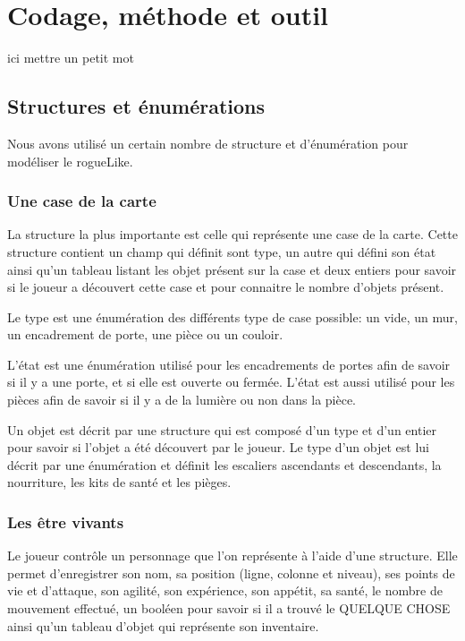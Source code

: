 \documentclass[11pt]{report}
\begin{document}
\chapter{Codage, méthode et outil}

ici mettre un petit mot

	\section{Structures et énumérations}
	
	Nous avons utilisé un certain nombre de structure et d'énumération pour modéliser le rogueLike.
	
		\subsection{Une case de la carte}
	
		La structure la plus importante est celle qui représente une case de la carte. Cette structure contient un champ qui définit sont type, un autre qui défini son état ainsi qu'un tableau listant les objet présent sur la case et deux entiers pour savoir si le joueur a découvert cette case et pour connaitre le nombre d'objets présent.
	
		Le type est une énumération des différents type de case possible: un vide, un mur, un encadrement de porte, une pièce ou un couloir.
	
		L'état est une énumération utilisé pour les encadrements de portes afin de savoir si il y a une porte, et si elle est ouverte ou fermée. L'état est aussi utilisé pour les pièces afin de savoir si il y a de la lumière ou non dans la pièce.
	
		Un objet est décrit par une structure qui est composé d'un type et d'un entier pour savoir si l'objet a été découvert par le joueur. Le type d'un objet est lui décrit par une énumération et définit les escaliers ascendants et descendants, la nourriture, les kits de santé et les pièges.
		
		\subsection{Les être vivants}
		
		Le joueur contrôle un personnage que l'on représente à l'aide d'une structure. Elle permet d'enregistrer son nom, sa position (ligne, colonne et niveau), ses points de vie et d'attaque, son agilité, son expérience, son appétit, sa santé, le nombre de mouvement effectué, un booléen pour savoir si il a trouvé le QUELQUE CHOSE ainsi qu'un tableau d'objet qui représente son inventaire.
		
\end{document}
